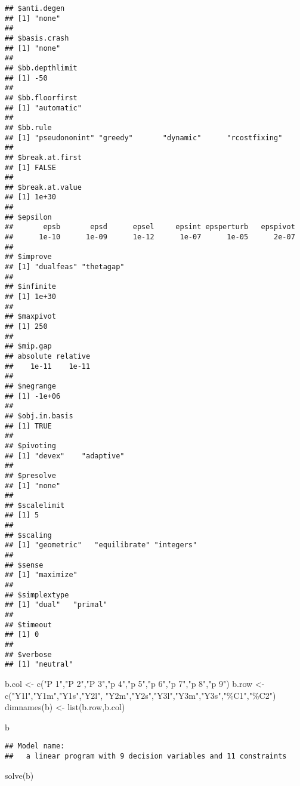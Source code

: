 \documentclass[
]{article}
\newenvironment{Shaded}{\begin{snugshade}}{\end{snugshade}}
\newcommand{\FunctionTok}[1]{\textcolor[rgb]{0.00,0.00,0.00}{#1}}
\newcommand{\NormalTok}[1]{#1}
\newcommand{\OtherTok}[1]{\textcolor[rgb]{0.56,0.35,0.01}{#1}}
\newcommand{\StringTok}[1]{\textcolor[rgb]{0.31,0.60,0.02}{#1}}
\begin{document}
\begin{verbatim}
## $anti.degen
## [1] "none"
## 
## $basis.crash
## [1] "none"
## 
## $bb.depthlimit
## [1] -50
## 
## $bb.floorfirst
## [1] "automatic"
## 
## $bb.rule
## [1] "pseudononint" "greedy"       "dynamic"      "rcostfixing" 
## 
## $break.at.first
## [1] FALSE
## 
## $break.at.value
## [1] 1e+30
## 
## $epsilon
##       epsb       epsd      epsel     epsint epsperturb   epspivot 
##      1e-10      1e-09      1e-12      1e-07      1e-05      2e-07 
## 
## $improve
## [1] "dualfeas" "thetagap"
## 
## $infinite
## [1] 1e+30
## 
## $maxpivot
## [1] 250
## 
## $mip.gap
## absolute relative 
##    1e-11    1e-11 
## 
## $negrange
## [1] -1e+06
## 
## $obj.in.basis
## [1] TRUE
## 
## $pivoting
## [1] "devex"    "adaptive"
## 
## $presolve
## [1] "none"
## 
## $scalelimit
## [1] 5
## 
## $scaling
## [1] "geometric"   "equilibrate" "integers"   
## 
## $sense
## [1] "maximize"
## 
## $simplextype
## [1] "dual"   "primal"
## 
## $timeout
## [1] 0
## 
## $verbose
## [1] "neutral"
\end{verbatim}

\begin{Shaded}
\begin{Highlighting}[]
\NormalTok{b.col }\OtherTok{\textless{}{-}} \FunctionTok{c}\NormalTok{(}\StringTok{"P 1"}\NormalTok{,}\StringTok{"P 2"}\NormalTok{,}\StringTok{"P 3"}\NormalTok{,}\StringTok{"p 4"}\NormalTok{,}\StringTok{"p 5"}\NormalTok{,}\StringTok{"p 6"}\NormalTok{,}\StringTok{"p 7"}\NormalTok{,}\StringTok{"p 8"}\NormalTok{,}\StringTok{"p 9"}\NormalTok{) }
\NormalTok{b.row }\OtherTok{\textless{}{-}} \FunctionTok{c}\NormalTok{(}\StringTok{"Y1l"}\NormalTok{,}\StringTok{"Y1m"}\NormalTok{,}\StringTok{"Y1s"}\NormalTok{,}\StringTok{"Y2l"}\NormalTok{, }\StringTok{"Y2m"}\NormalTok{,}\StringTok{"Y2s"}\NormalTok{,}\StringTok{"Y3l"}\NormalTok{,}\StringTok{"Y3m"}\NormalTok{,}\StringTok{"Y3s"}\NormalTok{,}\StringTok{"\%C1"}\NormalTok{,}\StringTok{"\%C2"}\NormalTok{) }
\FunctionTok{dimnames}\NormalTok{(b) }\OtherTok{\textless{}{-}} \FunctionTok{list}\NormalTok{(b.row,b.col)}

\NormalTok{b}
\end{Highlighting}
\end{Shaded}

\begin{verbatim}
## Model name: 
##   a linear program with 9 decision variables and 11 constraints
\end{verbatim}

\begin{Shaded}
\begin{Highlighting}[]
\FunctionTok{solve}\NormalTok{(b)}
\end{Highlighting}
\end{Shaded}
\end{document}
